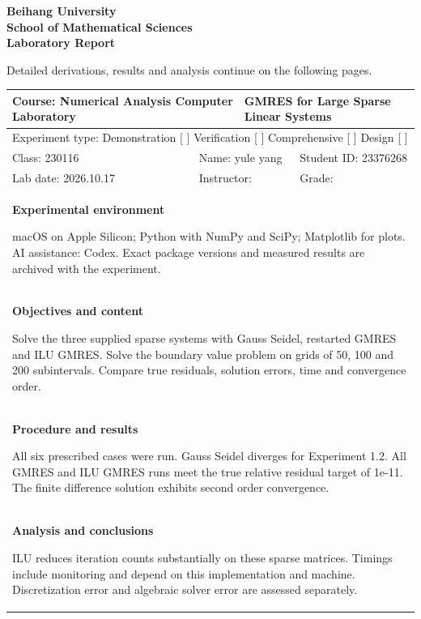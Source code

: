 \documentclass[a4paper,11pt]{article}
\begin{document}
\thispagestyle{empty}
\begin{center}{\Large\bfseries Beihang University\\School of Mathematical Sciences\\Laboratory Report}\end{center}
{\small Detailed derivations, results and analysis continue on the following pages.}\par
\vspace{3mm}
\begin{tabular}{|p{.22\linewidth}|p{.22\linewidth}|p{.22\linewidth}|p{.22\linewidth}|}\hline
\multicolumn{2}{|p{.47\linewidth}|}{Course: Numerical Analysis Computer Laboratory} & \multicolumn{2}{p{.43\linewidth}|}{GMRES for Large Sparse Linear Systems}\\\hline
\multicolumn{4}{|l|}{Experiment type: Demonstration [ ] Verification [ ] Comprehensive [ ] Design [ ]}\\\hline
Class: 230116 & \multicolumn{2}{l|}{Name: yule yang} & Student ID: 23376268\\\hline
Lab date: 2026.10.17 & \multicolumn{2}{l|}{Instructor:} & Grade:\\\hline

\multicolumn{4}{|p{.95\linewidth}|}{\textbf{Experimental environment}\par macOS on Apple Silicon; Python with NumPy and SciPy; Matplotlib for plots. AI assistance: Codex. Exact package versions and measured results are archived with the experiment.\par\vspace{4mm}}\\\hline
\multicolumn{4}{|p{.95\linewidth}|}{\textbf{Objectives and content}\par Solve the three supplied sparse systems with Gauss Seidel, restarted GMRES and ILU GMRES. Solve the boundary value problem on grids of 50, 100 and 200 subintervals. Compare true residuals, solution errors, time and convergence order.\par\vspace{4mm}}\\\hline
\multicolumn{4}{|p{.95\linewidth}|}{\textbf{Procedure and results}\par All six prescribed cases were run. Gauss Seidel diverges for Experiment 1.2. All GMRES and ILU GMRES runs meet the true relative residual target of 1e-11. The finite difference solution exhibits second order convergence.\par\vspace{4mm}}\\\hline
\multicolumn{4}{|p{.95\linewidth}|}{\textbf{Analysis and conclusions}\par ILU reduces iteration counts substantially on these sparse matrices. Timings include monitoring and depend on this implementation and machine. Discretization error and algebraic solver error are assessed separately.\par\vspace{4mm}}\\\hline
\end{tabular}
\clearpage
\end{document}
